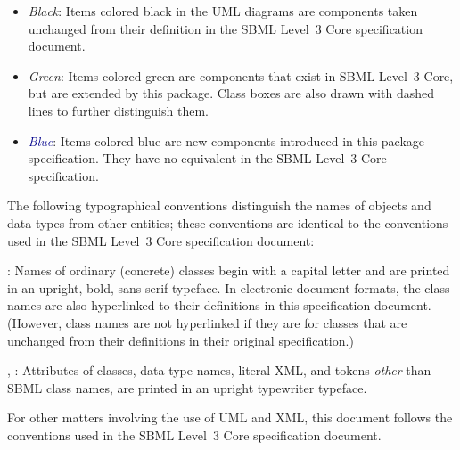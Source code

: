 \begin{itemize}

\item[\raisebox{2.75pt}{\colorbox{black}{\rule{0.8pt}{0.8pt}}}]
  \emph{Black}: Items colored black in the UML diagrams are components
  taken unchanged from their definition in the SBML Level~3 Core
  specification document.

\item[\raisebox{2.75pt}{\colorbox{mediumgreen}{\rule{0.8pt}{0.8pt}}}]
  \emph{\textcolor{mediumgreen}{Green}}: Items colored green are
  components that exist in SBML Level~3 Core, but are extended by this
  package.  Class boxes are also drawn with dashed lines to further
  distinguish them.

\item[\raisebox{2.75pt}{\colorbox{darkblue}{\rule{0.8pt}{0.8pt}}}]
  \emph{\textcolor{darkblue}{Blue}}: Items colored blue are new
  components introduced in this package specification.  They have no
  equivalent in the SBML Level~3 Core specification.

\end{itemize}

The following typographical conventions distinguish the names of objects and data types from other entities; these conventions are identical to the conventions used in the SBML Level~3 Core specification document:

\begin{description}
  
\item {}: Names of ordinary (concrete) classes begin with a capital letter and are printed in an upright, bold, sans-serif typeface.  In electronic document formats, the class names are also hyperlinked to their definitions in this specification document.  (However, class names are not hyperlinked if they are for classes that are unchanged from their definitions in their original specification.)

\item {}, : Attributes of classes, data type names, literal XML, and tokens \emph{other} than SBML class names, are printed in an upright typewriter typeface.

\end{description}

For other matters involving the use of UML and XML, this document follows the conventions used in the SBML Level~3 Core specification document.
